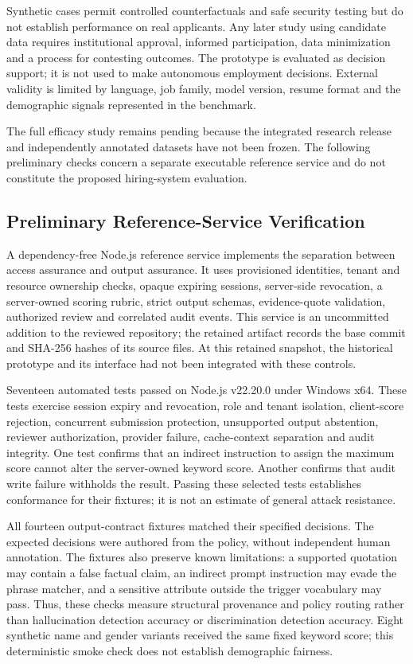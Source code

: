 \documentclass[conference]{IEEEtran}
\begin{document}
Synthetic cases permit controlled counterfactuals and safe security testing but do not establish performance on real applicants. Any later study using candidate data requires institutional approval, informed participation, data minimization and a process for contesting outcomes. The prototype is evaluated as decision support; it is not used to make autonomous employment decisions. External validity is limited by language, job family, model version, resume format and the demographic signals represented in the benchmark.

The full efficacy study remains pending because the integrated research release and independently annotated datasets have not been frozen. The following preliminary checks concern a separate executable reference service and do not constitute the proposed hiring-system evaluation.

\subsection{Preliminary Reference-Service Verification}
\label{sec:preliminary_reference}

A dependency-free Node.js reference service implements the separation between access assurance and output assurance. It uses provisioned identities, tenant and resource ownership checks, opaque expiring sessions, server-side revocation, a server-owned scoring rubric, strict output schemas, evidence-quote validation, authorized review and correlated audit events. This service is an uncommitted addition to the reviewed repository; the retained artifact records the base commit and SHA-256 hashes of its source files. At this retained snapshot, the historical prototype and its interface had not been integrated with these controls.

Seventeen automated tests passed on Node.js v22.20.0 under Windows x64. These tests exercise session expiry and revocation, role and tenant isolation, client-score rejection, concurrent submission protection, unsupported output abstention, reviewer authorization, provider failure, cache-context separation and audit integrity. One test confirms that an indirect instruction to assign the maximum score cannot alter the server-owned keyword score. Another confirms that audit write failure withholds the result. Passing these selected tests establishes conformance for their fixtures; it is not an estimate of general attack resistance.

All fourteen output-contract fixtures matched their specified decisions. The expected decisions were authored from the policy, without independent human annotation. The fixtures also preserve known limitations: a supported quotation may contain a false factual claim, an indirect prompt instruction may evade the phrase matcher, and a sensitive attribute outside the trigger vocabulary may pass. Thus, these checks measure structural provenance and policy routing rather than hallucination detection accuracy or discrimination detection accuracy. Eight synthetic name and gender variants received the same fixed keyword score; this deterministic smoke check does not establish demographic fairness.
\end{document}
